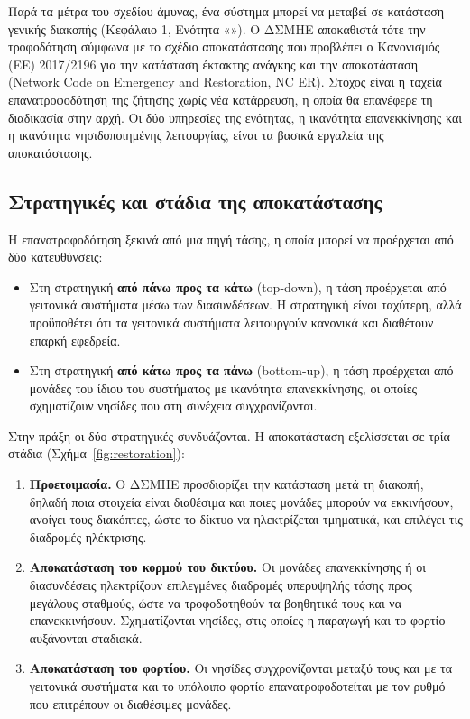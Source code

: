 Παρά τα μέτρα του σχεδίου άμυνας, ένα σύστημα μπορεί να μεταβεί σε κατάσταση γενικής διακοπής
(Κεφάλαιο 1, Ενότητα «»). Ο ΔΣΜΗΕ αποκαθιστά τότε την τροφοδότηση σύμφωνα με
το σχέδιο αποκατάστασης που προβλέπει ο Κανονισμός (ΕΕ) 2017/2196 για την κατάσταση έκτακτης
ανάγκης και την αποκατάσταση (Network Code on Emergency and Restoration, NC ER). Στόχος είναι η
ταχεία επανατροφοδότηση της ζήτησης χωρίς νέα κατάρρευση, η οποία θα επανέφερε τη διαδικασία
στην αρχή. Οι δύο υπηρεσίες της ενότητας, η ικανότητα επανεκκίνησης και η ικανότητα
νησιδοποιημένης λειτουργίας, είναι τα βασικά εργαλεία της αποκατάστασης.

\subsection{Στρατηγικές και στάδια της αποκατάστασης}
\label{sec:restoration-stages}

Η επανατροφοδότηση ξεκινά από μια πηγή τάσης, η οποία μπορεί να προέρχεται από δύο κατευθύνσεις:

\begin{itemize}
\item Στη στρατηγική \textbf{από πάνω προς τα κάτω} (top-down), η τάση προέρχεται από γειτονικά
      συστήματα μέσω των διασυνδέσεων. Η στρατηγική είναι ταχύτερη, αλλά προϋποθέτει ότι τα
      γειτονικά συστήματα λειτουργούν κανονικά και διαθέτουν επαρκή εφεδρεία.
\item Στη στρατηγική \textbf{από κάτω προς τα πάνω} (bottom-up), η τάση προέρχεται από μονάδες
      του ίδιου του συστήματος με ικανότητα επανεκκίνησης, οι οποίες σχηματίζουν νησίδες που
      στη συνέχεια συγχρονίζονται.
\end{itemize}

Στην πράξη οι δύο στρατηγικές συνδυάζονται. Η αποκατάσταση εξελίσσεται σε τρία στάδια
(Σχήμα~\ref{fig:restoration}):

\begin{enumerate}
\item \textbf{Προετοιμασία.} Ο ΔΣΜΗΕ προσδιορίζει την κατάσταση μετά τη διακοπή, δηλαδή ποια
      στοιχεία είναι διαθέσιμα και ποιες μονάδες μπορούν να εκκινήσουν, ανοίγει τους
      διακόπτες, ώστε το δίκτυο να ηλεκτρίζεται τμηματικά, και επιλέγει τις διαδρομές
      ηλέκτρισης.
\item \textbf{Αποκατάσταση του κορμού του δικτύου.} Οι μονάδες επανεκκίνησης ή οι διασυνδέσεις
      ηλεκτρίζουν επιλεγμένες διαδρομές υπερυψηλής τάσης προς μεγάλους σταθμούς, ώστε να
      τροφοδοτηθούν τα βοηθητικά τους και να επανεκκινήσουν. Σχηματίζονται νησίδες, στις οποίες
      η παραγωγή και το φορτίο αυξάνονται σταδιακά.
\item \textbf{Αποκατάσταση του φορτίου.} Οι νησίδες συγχρονίζονται μεταξύ τους και με τα
      γειτονικά συστήματα και το υπόλοιπο φορτίο επανατροφοδοτείται με τον ρυθμό που
      επιτρέπουν οι διαθέσιμες μονάδες.
\end{enumerate}

